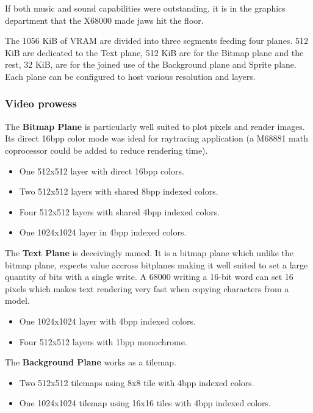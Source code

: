 If both music and sound capabilities were outstanding, it is in the graphics department that the X68000 made jaws hit the floor.

The 1056 KiB of VRAM are divided into three segments feeding four planes. 512 KiB are dedicated to the Text plane, 512 KiB are for the Bitmap plane and the rest, 32 KiB, are for the joined use of the Background plane and Sprite plane. Each plane can be configured to host various resolution and layers.

\subsubsection{Video prowess}

The \textbf{Bitmap Plane} is particularly well suited to plot pixels and render images. Its direct 16bpp color mode was ideal for raytracing application (a M68881 math coprocessor could be added to reduce rendering time). 


\begin{itemize}[topsep=0pt]
\item One 512x512 layer with direct 16bpp colors.
\item Two 512x512 layers with shared 8bpp indexed colors.
\item Four 512x512 layers with shared 4bpp indexed colors.
\item One 1024x1024 layer in 4bpp indexed colors.
\end{itemize}

The \textbf{Text Plane} is deceivingly named. It is a bitmap plane which unlike the bitmap plane, expects value accross bitplanes making it well suited to set a large quantity of bits with a single write. A 68000 writing a 16-bit word can set 16 pixels which makes text rendering very fast when copying characters from a model. 

\begin{itemize}[topsep=0pt]
\item One 1024x1024 layer with 4bpp indexed colors.
\item Four 512x512 layers with 1bpp monochrome.
\end{itemize}


The \textbf{Background Plane} works as a tilemap. 
\begin{itemize}[topsep=0pt]
\item Two 512x512 tilemaps using 8x8 tile with 4bpp indexed colors.
\item One 1024x1024 tilemap using 16x16 tiles with 4bpp indexed colors.
\end{itemize}


